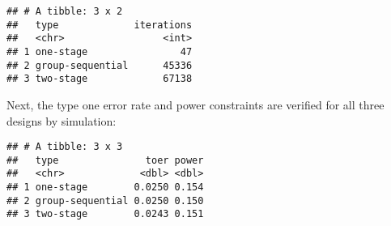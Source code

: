 \documentclass[
]{book}
\newenvironment{Shaded}{\begin{snugshade}}{\end{snugshade}}
\newcommand{\AttributeTok}[1]{\textcolor[rgb]{0.77,0.63,0.00}{#1}}
\newcommand{\CommentTok}[1]{\textcolor[rgb]{0.56,0.35,0.01}{\textit{#1}}}
\newcommand{\DecValTok}[1]{\textcolor[rgb]{0.00,0.00,0.81}{#1}}
\newcommand{\FunctionTok}[1]{\textcolor[rgb]{0.00,0.00,0.00}{#1}}
\newcommand{\NormalTok}[1]{#1}
\newcommand{\SpecialCharTok}[1]{\textcolor[rgb]{0.00,0.00,0.00}{#1}}
\begin{document}
\begin{verbatim}
## # A tibble: 3 x 2
##   type             iterations
##   <chr>                 <int>
## 1 one-stage                47
## 2 group-sequential      45336
## 3 two-stage             67138
\end{verbatim}

Next, the type one error rate and power constraints are verified for all three designs by simulation:

\begin{Shaded}
\end{Shaded}

\begin{verbatim}
## # A tibble: 3 x 3
##   type               toer power
##   <chr>             <dbl> <dbl>
## 1 one-stage        0.0250 0.154
## 2 group-sequential 0.0250 0.150
## 3 two-stage        0.0243 0.151
\end{verbatim}
\end{document}
